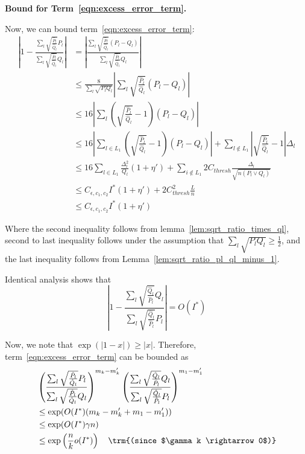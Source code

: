 \documentclass{article}
\begin{document}
\textbf{Bound for Term~\ref{eqn:excess_error_term}.} 

Now, we can bound term~\ref{eqn:excess_error_term}:
\begin{align*}
\left| 1 -  \frac{\sum_l \sqrt{\frac{\hat{P}_l}{\hat{Q}_l} } P_l}
                {\sum_l \sqrt{\frac{\hat{P}_l}{\hat{Q}_l} } Q_l}  \right|
 &= \left| \frac{ \sum_l \sqrt{ \frac{\hat{P}_l}{\hat{Q}_l}} (P_l - Q_l) }
     { \sum_l \sqrt{ \frac{\hat{P}_l}{\hat{Q}_l}} Q_l } \right| \\
&\leq \frac{8}{\sum_l \sqrt{P_l Q_l}} 
     \left| \sum_l \sqrt{ \frac{\hat{P}_l}{\hat{Q}_l} }(P_l - Q_l) \right| \\
&\leq 16 \left|  \sum_{l} \left( \sqrt{ \frac{\hat{P}_l}{\hat{Q}_l} } - 1 \right) (P_l - Q_l)  \right| \\
&\leq 16 \left| 
     \sum_{l \in L_1} \left( \sqrt{\frac{\hat{P}_l}{\hat{Q}_l}} - 1 \right)(P_l - Q_l) 
     \right| + \sum_{l \notin L_1} \left| \sqrt{ \frac{\hat{P}_l}{\hat{Q}_l}} - 1 \right| \Delta_l \\
&\leq 16 \sum_{l \in L_1} \frac{\Delta^2_l}{Q_l}(1+ \eta') + 
      \sum_{i \notin L_1} 2 C_{thresh} \frac{\Delta_l}{\sqrt{n (P_l \vee Q_l)}} \\
&\leq C_{\epsilon, c_1, c_2} I^* (1 + \eta') + 2 C_{thresh}^2 \frac{L}{n} \\
&\leq C_{\epsilon, c_1, c_2} I^* (1 + \eta')
\end{align*}


Where the second inequality follows from lemma~\ref{lem:sqrt_ratio_times_ql},
second to last inequality follows under the assumption that $\sum_l \sqrt{P_l Q_l} \geq \frac{1}{2}$, and the last inequality follows from Lemma~\ref{lem:sqrt_ratio_pl_ql_minus_1}. 

Identical analysis shows that
\[
\left| 1 - \frac{ \sum_l \sqrt{\frac{\hat{Q}_l}{\hat{P}_l} } Q_l}
             { \sum_l \sqrt{\frac{\hat{Q}_l}{\hat{P}_l} } P_l} \right| 
= O(I^*) 
\]

Now, we note that $\exp( | 1 - x | ) \geq |x|$. 
Therefore, term~\ref{eqn:excess_error_term} can be bounded as
\begin{align*}
&  \left( \frac{\sum_l \sqrt{\frac{\hat{P}_l}{\hat{Q}_l} } P_l}
                {\sum_l \sqrt{\frac{\hat{P}_l}{\hat{Q}_l} } Q_l}  \right)^{m_k - m_k'}
 \left( \frac{ \sum_l \sqrt{\frac{\hat{Q}_l}{\hat{P}_l} } Q_l}
             { \sum_l \sqrt{\frac{\hat{Q}_l}{\hat{P}_l} } P_l} \right)^{m_1 - m_1'}  \\
&\leq \exp( O(I^*) (m_k - m_k' + m_1 - m_1') ) \\
&\leq \exp( O(I^*) \gamma n) \\
&\leq \exp\left( \frac{n}{k} o(I^*) \right) \quad \trm{(since $\gamma k \rightarrow 0$)}
\end{align*}
\end{document}
